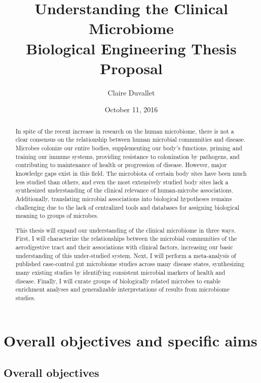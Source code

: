 \documentclass[12pt]{article}
\title{Understanding the Clinical Microbiome \\ Biological Engineering Thesis Proposal}
\author{Claire Duvallet}
\date{October 11, 2016}
\begin{document}
\maketitle
\newpage
\tableofcontents
\newpage
\begin{abstract}
In spite of the recent increase in research on the human 
microbiome, there is not a clear consensus on the relationship between 
human microbial communities and disease. Microbes colonize our entire bodies,
supplementing our body's functions, priming and training our immune 
systems, providing resistance to colonization 
by pathogens, and contributing to maintenance of health or progression of disease. 
However, major knowledge gaps exist in this field. 
The microbiota of certain body sites have been much less studied than others, and 
even the most extensively studied body sites lack a 
synthesized understanding of the clinical relevance of human-microbe associations. 
Additionally, translating microbial associations into biological hypotheses
remains challenging due to the lack of centralized tools and databases
for assigning biological meaning to groups of microbes.

This thesis will expand our understanding of the clinical microbiome in three ways.
First, I will characterize the relationships between the microbial communities
of the aerodigestive tract and their associations with clinical factors, 
increasing our basic understanding of this under-studied system.
Next, I will perform a meta-analysis of published case-control gut microbiome studies
across many disease states, synthesizing many existing studies by 
identifying consistent microbial markers of health and disease.
Finally, I will curate groups of biologically related microbes
to enable enrichment analyses and generalizable interpretations
of results from microbiome studies. 



\end{abstract}
\newpage

\section{Overall objectives and specific aims}
\subsection{Overall objectives}
\end{document}

